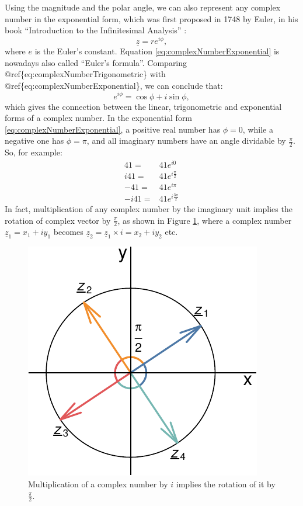 \documentclass[
]{book}
\begin{document}
Using the magnitude and the polar angle, we can also represent any complex number in the exponential form, which was first proposed in 1748 by Euler, in his book ``Introduction to the Infinitesimal Analysis'' \citep{Euler1748}:
\begin{equation}
    \underline{z} = r e^{i \phi} ,
    \label{eq:complexNumberExponential}
\end{equation}
where \(e\) is the Euler's constant. Equation \eqref{eq:complexNumberExponential} is nowadays also called ``Euler's formula''. Comparing @ref\{eq:complexNumberTrigonometric\} with @ref\{eq:complexNumberExponential\}, we can conclude that:
\begin{equation}
    e^{i \phi} = \cos \phi + i \sin \phi ,
    \label{eq:EulerFormula}
\end{equation}
which gives the connection between the linear, trigonometric and exponential forms of a complex number. In the exponential form \eqref{eq:complexNumberExponential}, a positive real number has \(\phi=0\), while a negative one has \(\phi=\pi\), and all imaginary numbers have an angle dividable by \(\frac{\pi}{2}\). So, for example:
\begin{equation*}
    \begin{aligned}
    41 = & 41 e^{i 0} \\
    i41 = & 41 e^{i \frac{\pi}{2}} \\
    -41 = & 41 e^{i \pi} \\
    -i41 = & 41 e^{i \frac{3 \pi}{2}}
    \end{aligned}
\end{equation*}
In fact, multiplication of any complex number by the imaginary unit implies the rotation of complex vector by \(\frac{\pi}{2}\), as shown in Figure \ref{fig:complexPlaneMultiplication}, where a complex number \(\underline{z}_1 = x_1 + i y_1\) becomes \(\underline{z}_2 = \underline{z}_1 \times i = x_2 + i y_2\) etc.

\begin{figure}
\centering
\includegraphics{Svetunkov---Svetunkov---Complex-Valued-Econometrics_files/figure-latex/complexPlaneMultiplication-1.pdf}
\caption{\label{fig:complexPlaneMultiplication}Multiplication of a complex number by \(i\) implies the rotation of it by \(\frac{\pi}{2}\).}
\end{figure}
\end{document}
